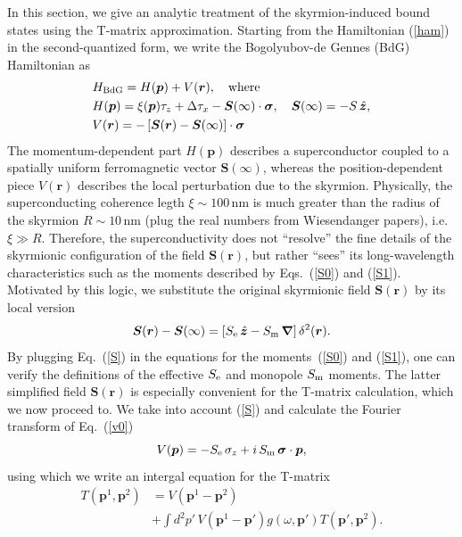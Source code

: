\documentclass[twocolumn,showpacs,floatfix,nofootinbib,longbibliography]{revtex4-1}
\begin{document}
In this section, we give an analytic treatment of the skyrmion-induced bound states using the T-matrix approximation. Starting from the Hamiltonian (\ref{ham}) in the second-quantized form, we write the Bogolyubov-de Gennes (BdG) Hamiltonian as 
\begin{align}
	& H_{\rm BdG} = H(\bm p) + V(\bm r),\quad {\rm where} \nonumber \\
& H(\bm p) = \xi(\bm p)\tau_z+\Delta \tau_x - \bm S(\infty)\cdot\bm\sigma,\quad \bm S(\infty) = -S\,\hat{\bm z}, \nonumber\\
& V(\bm r) = -\left[ \bm S(\bm r)-\bm S(\infty)\right]\cdot\bm\sigma \label{v0}
\end{align}
The momentum-dependent part $H(\bm p)$ describes a superconductor coupled to a spatially uniform ferromagnetic vector $\bm S(\infty)$, whereas the position-dependent piece $V(\bm r)$ describes the local perturbation due to the skyrmion. Physically, the superconducting coherence legth $\xi\sim 100$\,nm is much greater than the radius of the skyrmion $R\sim 10$\,nm (plug the real numbers from Wiesendanger papers), i.e. $\xi\gg R$. Therefore, the superconductivity does not ``resolve'' the fine details of the skyrmionic configuration of the field  $\bm S(\bm r)$, but rather ``sees'' its long-wavelength characteristics such as the moments described by Eqs.~(\ref{S0}) and (\ref{S1}). Motivated by this logic, we substitute the original skyrmionic field $\bm S(\bm r)$ by its local version 
\begin{equation}
	\bm S(\bm r) - \bm S(\infty) = \left[ S_{\rm e}\, \hat{\bm z} - S_{\rm m}\, \bm \nabla\right] \delta^2(\bm r).
	\label{S}
\end{equation}
By plugging Eq.~(\ref{S}) in the equations for the moments~(\ref{S0}) and (\ref{S1}), one can verify the definitions of the effective $S_{\rm e}$ and monopole $S_{\rm m}$ moments.  The latter simplified field $\bm S(\bm r)$ is especially convenient for the T-matrix calculation, which we now proceed to. We take into account (\ref{S}) and calculate the Fourier transform of Eq.~(\ref{v0})  
\begin{equation}
	V(\bm p) = -S_{\rm e}\,\sigma_z +  i \,S_{\rm m} \, \bm \sigma\cdot \bm  p,
	\label{vp}
\end{equation}
using which we write an intergal equation for the T-matrix
\begin{align}
	T\left(\bm p^{1},\bm p^{2}\right) &= V \left(\bm p^{1}-\bm p^{2}\right) \nonumber \\
	& +\int d^2 p'\, V\left(\bm p^{1}-\bm p'\right) g(\omega,\bm p')  T\left(\bm p',\bm p^{2}\right).
	\label{integEq}
\end{align}
\end{document}
